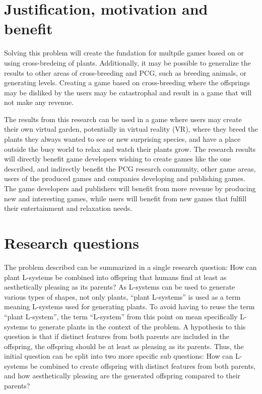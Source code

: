 \section{Justification, motivation and benefit}
Solving this problem will create the fundation for multpile games based on or using cross-bredeing of plants.
Additionally, it may be possible to generalize the results to other areas of cross-breeding and PCG, such as breeding animals, or generating levels.
Creating a game based on cross-breeding where the offsprings may be disliked by the users may be catastrophal and result in a game that will not make any revenue.

The results from this research can be used in a game where users may create their own virtual garden, potentially in virtual reality (VR), where they breed the plants they always wanted to see or new surprising species, and have a place outside the busy world to relax and watch their plants grow.
The research results will directly benefit game developers wishing to create games like the one described, and indirectly benefit the PCG research community, other game areas, users of the produced games and companies developing and publishing games.
The game developers and publishers will benefit from more revenue by producing new and interesting games, while users will benefit from new games that fulfill their entertainment and relaxation needs.

\section{Research questions}
The problem described can be summarized in a single research question: How can plant L-systems be combined into offspring that humans find at least as aesthetically pleasing as its parents?
As L-systems can be used to generate various types of shapes, not only plants, ``plant L-systems'' is used as a term meaning L-systems used for generating plants.
To avoid having to reuse the term ``plant L-system'', the term ``L-system'' from this point on mean specifically L-systems to generate plants in the context of the problem.
A hypothesis to this question is that if distinct features from both parents are included in the offspring, the offspring should be at least as pleasing as its parents.
Thus, the initial question can be split into two more specific sub questions: How can L-systems be combined to create offspring with distinct features from both parents, and how aesthetically pleasing are the generated offspring compared to their parents?

